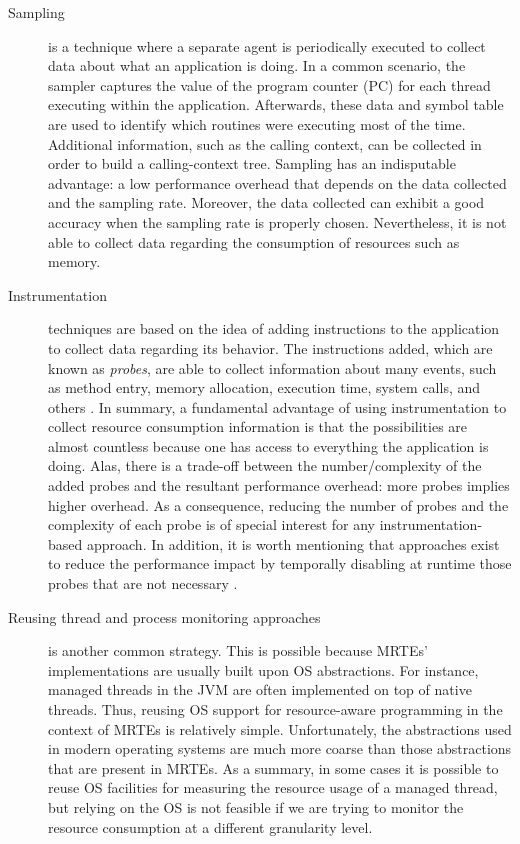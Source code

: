 \begin{description}
\item[Sampling] is a technique where a separate agent is periodically executed to collect data about what an application is doing.
In a common scenario, the sampler captures the value of the program counter (PC) for each thread executing within the application.
Afterwards, these data and symbol table are used to identify which routines were executing most of the time.
Additional information, such as the calling context, can be collected in order to build a calling-context tree.
Sampling has an indisputable advantage: a low performance overhead that depends on the data collected and the sampling rate.
Moreover, the data collected can exhibit a good accuracy when the sampling rate is properly chosen.  
Nevertheless, it is not able to collect data regarding the consumption of resources such as memory.

\item[Instrumentation] techniques are based on the idea of adding instructions to the application to collect data regarding its behavior.
The instructions added, which are known as \textit{probes}, are able to collect information about many events, such as method entry, memory allocation, execution time, system calls, and others \cite{Ayers:2005:TFF:1064978.1065035,Sarimbekov201161,Ansaloni:2010:RDE:1712605.1712616}.
In summary, a fundamental advantage of using instrumentation to collect resource consumption information is that the possibilities are almost countless because one has access to everything the application is doing.
Alas, there is a trade-off between the number/complexity of the added probes and the resultant performance overhead: more probes implies higher overhead.
As a consequence, reducing the number of probes and the complexity of each probe is of special interest for any instrumentation-based approach.
In addition, it is worth mentioning that approaches exist to reduce the performance impact by temporally disabling at runtime those probes that are not necessary \cite{Dmitriev:2004:PJA:974043.974067,citeulike:481405,Gregg:2011:DDT:1971960}.  

\item[Reusing thread and process monitoring approaches] is another common strategy.
This is possible because MRTEs' implementations are usually built upon OS abstractions.
For instance, managed threads in the JVM are often implemented on top of native threads.
Thus, reusing OS support for resource-aware programming in the context of MRTEs is relatively simple. 
Unfortunately, the abstractions used in modern operating systems are much more coarse than those abstractions that are present in MRTEs.
As a summary, in some cases it is possible to reuse OS facilities for measuring the resource usage of a managed thread, but relying on the OS is not feasible if we are trying to monitor the resource consumption at a different granularity level.
\end{description}

